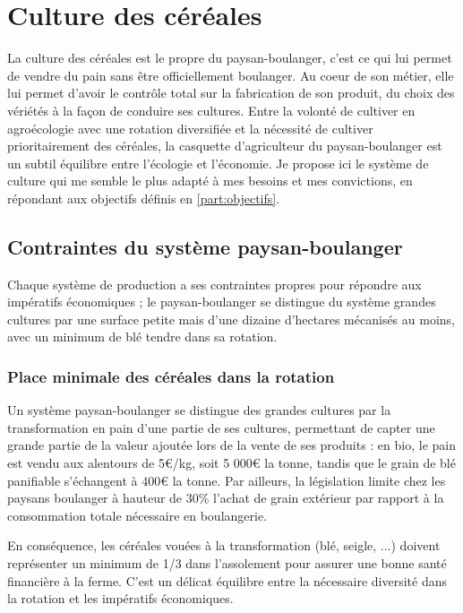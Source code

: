 \documentclass{book}
\begin{document}
\chapter{Culture des céréales}
\label{chap:cereales}

La culture des céréales est le propre du paysan-boulanger, c'est ce qui lui permet de vendre du pain sans être officiellement boulanger. Au coeur de son métier, elle lui permet d'avoir le contrôle total sur la fabrication de son produit, du choix des vériétés à la façon de conduire ses cultures. Entre la volonté de cultiver en agroécologie avec une rotation diversifiée et la nécessité de cultiver prioritairement des céréales, la casquette d'agriculteur du paysan-boulanger est un subtil équilibre entre l'écologie et l'économie. Je propose ici le système de culture qui me semble le plus adapté à mes besoins et mes convictions, en répondant aux objectifs définis en \ref{part:objectifs}.

\section{Contraintes du système paysan-boulanger}

Chaque système de production a ses contraintes propres pour répondre aux impératifs économiques ; le paysan-boulanger se distingue du système grandes cultures par une surface petite mais d'une dizaine d'hectares mécanisés au moins, avec un minimum de blé tendre dans sa rotation.

\subsection{Place minimale des céréales dans la rotation}

Un système paysan-boulanger se distingue des grandes cultures par la transformation en pain d'une partie de ses cultures, permettant de capter une grande partie de la valeur ajoutée lors de la vente de ses produits : en bio, le pain est vendu aux alentours de 5\euro{}/kg, soit 5 000\euro{} la tonne, tandis que le grain de blé panifiable s'échangent à 400\euro{} la tonne. Par ailleurs, la législation limite chez les paysans boulanger à hauteur de 30\% l'achat de grain extérieur par rapport à la consommation totale nécessaire en boulangerie. 

En conséquence, les céréales vouées à la transformation (blé, seigle, ...) doivent représenter un minimum de 1/3 dans l'assolement pour assurer une bonne santé financière à la ferme. C'est un délicat équilibre entre la nécessaire diversité dans la rotation et les impératifs économiques.
\end{document}
